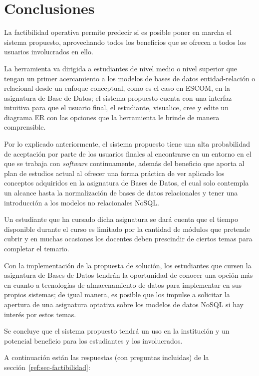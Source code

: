 \section{Conclusiones}

La factibilidad operativa permite predecir si es posible poner en marcha el sistema propuesto, aprovechando todos los beneficios que se ofrecen a todos los usuarios involucrados en ello.


La herramienta va dirigida a estudiantes de nivel medio o nivel superior que tengan un primer acercamiento a los modelos de bases de datos entidad-relación o relacional desde un enfoque conceptual, como es el caso en ESCOM, en la asignatura de Base de Datos; el sistema propuesto cuenta con una interfaz intuitiva para que el usuario final, el estudiante, visualice, cree y edite un diagrama ER con las opciones que la herramienta le brinde de manera comprensible.


Por lo explicado anteriormente, el sistema propuesto tiene una alta probabilidad de aceptación por parte de los usuarios finales al encontrarse en un entorno en el que se trabaja con \textit{software} continuamente, además del beneficio que aporta al plan de estudios actual al ofrecer una forma práctica de ver aplicado los conceptos adquiridos en la asignatura de Bases de Datos, el cual solo contempla un alcance hasta la normalización de bases de datos relacionales y tener una introducción a los modelos no relacionales NoSQL.


Un estudiante que ha cursado dicha asignatura se dará cuenta que el tiempo disponible durante el curso es limitado por la cantidad de módulos que pretende cubrir y en muchas ocasiones los docentes deben prescindir de ciertos temas para completar el temario.


Con la implementación de la propuesta de solución, los estudiantes que cursen la asignatura de Bases de Datos tendrán la oportunidad de conocer una opción más en cuanto a tecnologías de almacenamiento de datos para implementar en sus propios sistemas; de igual manera, es posible que los impulse a solicitar la apertura de una asignatura optativa sobre los modelos de datos NoSQL si hay interés por estos temas.


Se concluye que el sistema propuesto tendrá un uso en la institución y un potencial beneficio para los estudiantes y los involucrados.


A continuación están las respuestas (con preguntas incluidas) de la sección~\ref{ref:sec-factibilidad}:


